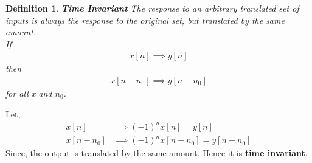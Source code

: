 \documentclass[journal,12pt,twocolumn]{IEEEtran}
\newtheorem{definition}{Definition}
\begin{document}
\begin{definition}{\textbf{Time Invariant}}
The response to an arbitrary translated set of inputs is always the response to the original set, but translated by the same amount.\\
If 
\begin{align}
    x[n]\implies y[n]
\end{align}
then
\begin{align}
    x[n-n_{0}] \implies y[n-n_{0}]
\end{align} for all x and $n_{0}$.
\end{definition}
Let,
\begin{align}
    x[n] &\implies (-1)^{n}x[n] = y[n]\\
    x[n-n_{0}] &\implies (-1)^{n}x[n-n_0] = y[n - n_0]
\end{align}
Since, the output is translated by the same amount. Hence it is \textbf{time invariant}.
\end{document}
